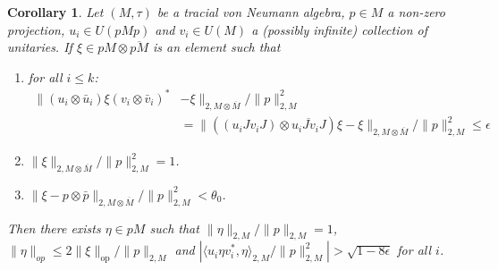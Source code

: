 \documentclass[11pt]{amsart}
\DeclareMathOperator{\op}{op}
\newtheorem{corollary}[theorem]{Corollary}
\theoremstyle{definition}
\theoremstyle{remark}
\theoremstyle{definition}
\begin{document}
\begin{corollary}
\label{cor:Connes_trick_vN}
    Let $(M,\tau)$ be a tracial von Neumann algebra, $p \in M$ a non-zero projection, $u_i \in U(pMp)$ and $v_i \in U(M)$ a (possibly infinite) collection of unitaries. 
    If $\xi \in pM \otimes \overline{pM}$ is an element such that 
    \begin{enumerate}
        \item  for  all $i \leq k$:
        \begin{align*}
            \| (u_i\otimes \bar u_i)\xi  (v_i \otimes \bar v_i)^* &- \xi \|_{2,M\otimes\overline M}/ \|p\|^2_{2,M} \\
            &=\| ((u_i Jv_iJ)\otimes \overline{u_iJv_iJ})\xi - \xi \|_{2,M\otimes\overline M}/ \|p\|^2_{2,M} \leq \epsilon
        \end{align*}
        \item $\| \xi \|_{2,M \otimes \overline{M}} / \|p\|^2_{2,M}= 1$.
        \item $\| \xi - p \otimes \bar p \|_{2, M \otimes \overline M}/ \|p\|^2_{2,M} < \theta_0$. 
    \end{enumerate}
   Then there exists $\eta \in pM$ such that $\| \eta \|_{2,M} / \|p \|_{2,M} = 1$, $\| \eta \|_{op} \leq 2 \| \xi\|_{\op} / \| p \|_{2,M}$ and $|\langle u_i\eta v_i^*,\eta \rangle_{2,M} / \| p \|_{2,M}^2| > \sqrt{1- 8\epsilon}$ for all $i$.
\end{corollary}
\end{document}
